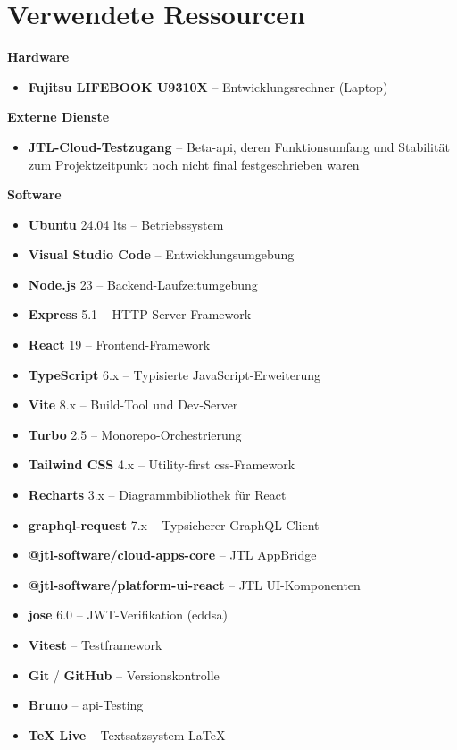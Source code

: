 \documentclass[11pt, a4paper, oneside]{report}
\begin{document}
\section{Verwendete Ressourcen}
\label{anhang:ressourcen}

\textbf{Hardware}
\begin{itemize}[leftmargin=1.5em]
  \item \textbf{Fujitsu LIFEBOOK U9310X} -- Entwicklungsrechner (Laptop)
\end{itemize}

\textbf{Externe Dienste}
\begin{itemize}[leftmargin=1.5em]
  \item \textbf{JTL-Cloud-Testzugang} -- Beta-\gls{api}, deren Funktionsumfang und Stabilität zum Projektzeitpunkt noch nicht final festgeschrieben waren
\end{itemize}

\textbf{Software}
\begin{itemize}[leftmargin=1.5em]
  \item \textbf{Ubuntu} 24.04 \gls{lts} -- Betriebssystem
  \item \textbf{Visual Studio Code} -- Entwicklungsumgebung
  \item \textbf{Node.js} 23 -- Backend-Laufzeitumgebung
  \item \textbf{Express} 5.1 -- HTTP-Server-Framework
  \item \textbf{React} 19 -- Frontend-Framework
  \item \textbf{TypeScript} 6.x -- Typisierte JavaScript-Erweiterung
  \item \textbf{Vite} 8.x -- Build-Tool und Dev-Server
  \item \textbf{Turbo} 2.5 -- Monorepo-Orchestrierung
  \item \textbf{Tailwind CSS} 4.x -- Utility-first \gls{css}-Framework
  \item \textbf{Recharts} 3.x -- Diagrammbibliothek für React
  \item \textbf{graphql-request} 7.x -- Typsicherer GraphQL-Client
  \item \textbf{@jtl-software/cloud-apps-core} -- JTL AppBridge
  \item \textbf{@jtl-software/platform-ui-react} -- JTL UI-Komponenten
  \item \textbf{jose} 6.0 -- JWT-Verifikation (\gls{eddsa})
  \item \textbf{Vitest} -- Testframework
  \item \textbf{Git} / \textbf{GitHub} -- Versionskontrolle
  \item \textbf{Bruno} -- \gls{api}-Testing
  \item \textbf{TeX Live} -- Textsatzsystem \LaTeX
\end{itemize}
\end{document}

